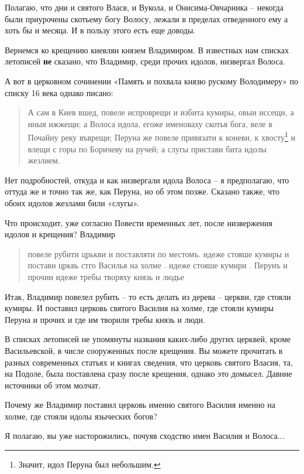 \documentclass[a5paper,11pt,openany]{article}
\begin{document}
   Полагаю, что дни и святого Власв, и Вукола, и Онисима-Овчарника – некогда были приурочены скотьему богу Волосу, лежали в пределах отведенного ему а хоть бы и месяца. И в пользу этого есть еще доводы.

   Вернемся ко крещению киевлян князем Владимиром. В известных нам списках летописей \textbf{не} сказано, что Владимир, среди прочих идолов, низвергал Волоса.

  А вот в церковном сочинении «Память и похвала князю рускому Володимеру» по списку 16 века однако писано:

\begin{quotation}
А сам в Киев вшед, повеле испроврещи и избита кумиры, овыи иссещи, а иныя ижжещи; а Волоса идола, егоже именоваху скотья бога, веле в Почайну реку въврещи; Перуна же повеле привязати к коневи, к хвосту\footnote{Значит, идол Перуна был небольшим.} и влещи с горы по Боричеву на ручей; а слугы пристави бита идолы жезлием.
\end{quotation}

   Нет подробностей, откуда и как низвергали идола Волоса – я предполагаю, что оттуда же и точно так же, как Перуна, но об этом позже. Сказано также, что обоих идолов жезлами били «слугы».

    Что происходит, уже согласно Повести временных лет, после низвержения идолов и крещения? Владимир 

\begin{quotation}
повеле рубити црькви и поставляти по местомъ. идеже стояше кумиры и постави црквь стго Василья на холме . идеже стояше кумири . Перунъ и прочии идеже требы творяху князь и людье
\end{quotation}

Итак, Владимир повелел рубить – то есть делать из дерева – церкви, где стояли кумиры. И поставил церковь святого Василия на холме, где стояли кумиры Перуна и прочих и где им творили требы князь и люди.

  В списках летописей не упомянуты названия каких-либо других церквей, кроме Васильевской, в числе сооруженных после крещения. Вы можете прочитать в разных современных статьях и книгах сведения, что церковь святого Власия, та, на Подоле, была поставлена сразу после крещения, однако это домысел. Давние источники об этом молчат.

  Почему же Владимир поставил церковь именно святого Василия именно на холме, где стояли идолы языческих богов?

   Я полагаю, вы уже насторожились, почуяв сходство имен Василия и Волоса...
\end{document}

